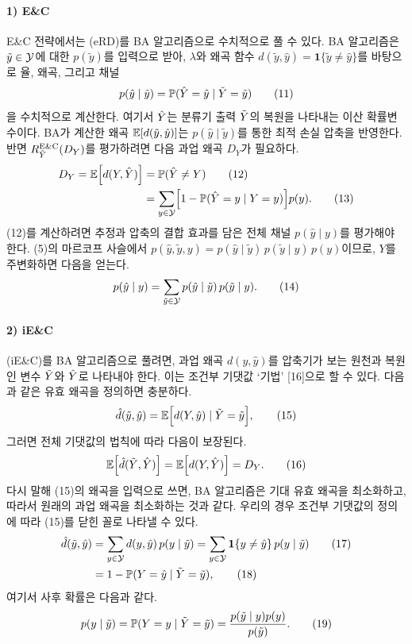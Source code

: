 \paragraph{1) E\&C}
E\&C 전략에서는 (eRD)를 BA 알고리즘으로 수치적으로 풀 수 있다. BA 알고리즘은 $\tilde y\in\mathcal{Y}$에 대한 $p(\tilde y)$를 입력으로 받아, $\lambda$와 왜곡 함수 $d(\tilde y,\hat y)=\mathbf 1\{\tilde y\ne\hat y\}$를 바탕으로 율, 왜곡, 그리고 채널
\begin{equation}
p(\hat y\mid\tilde y)=\mathbb{P}(\hat{Y}=\hat y\mid\tilde{Y}=\tilde y)\tag{11}
\end{equation}
을 수치적으로 계산한다. 여기서 $\hat{Y}$는 분류기 출력 $\tilde{Y}$의 복원을 나타내는 이산 확률변수이다. BA가 계산한 왜곡 $\mathbb{E}[d(\tilde y,\hat y)]$는 $p(\hat y\mid\tilde y)$를 통한 최적 손실 압축을 반영한다. 반면 $R_{\tilde{Y}}^{\mathrm{E\&C}}(D_Y)$를 평가하려면 다음 과업 왜곡 $D_Y$가 필요하다.
\begin{align}
D_Y=\mathbb{E}\Bigl[d(Y,\hat{Y})\Bigr]&=\mathbb{P}(\hat{Y}\ne Y)\tag{12}\\
&=\sum_{y\in\mathcal{Y}}\Bigl[1-\mathbb{P}(\hat{Y}=y\mid Y=y)\Bigr]p(y).\tag{13}
\end{align}
(12)를 계산하려면 추정과 압축의 결합 효과를 담은 전체 채널 $p(\hat y\mid y)$를 평가해야 한다. (5)의 마르코프 사슬에서 $p(\hat y,\tilde y,y)=p(\hat y\mid\tilde y)\,p(\tilde y\mid y)\,p(y)$이므로, $Y$를 주변화하면 다음을 얻는다.
\begin{equation}
p(\hat y\mid y)=\sum_{\tilde y\in\mathcal{Y}}p(\hat y\mid\tilde y)\,p(\tilde y\mid y).\tag{14}
\end{equation}

\paragraph{2) iE\&C}
(iE\&C)를 BA 알고리즘으로 풀려면, 과업 왜곡 $d(y,\hat y)$를 압축기가 보는 원천과 복원인 변수 $\tilde{Y}$와 $\hat{Y}$로 나타내야 한다. 이는 조건부 기댓값 `기법' [16]으로 할 수 있다. 다음과 같은 유효 왜곡을 정의하면 충분하다.
\begin{equation}
\hat d(\tilde y,\hat y)=\mathbb{E}\Bigl[d(Y,\hat y)\mid\tilde{Y}=\tilde y\Bigr],\tag{15}
\end{equation}
그러면 전체 기댓값의 법칙에 따라 다음이 보장된다.
\begin{equation}
\mathbb{E}\Bigl[\hat d(\tilde{Y},\hat{Y})\Bigr]=\mathbb{E}\Bigl[d(Y,\hat{Y})\Bigr]=D_Y.\tag{16}
\end{equation}
다시 말해 (15)의 왜곡을 입력으로 쓰면, BA 알고리즘은 기대 유효 왜곡을 최소화하고, 따라서 원래의 과업 왜곡을 최소화하는 것과 같다. 우리의 경우 조건부 기댓값의 정의에 따라 (15)를 닫힌 꼴로 나타낼 수 있다.
\begin{align}
\hat d(\tilde y,\hat y)&=\sum_{y\in\mathcal{Y}}d(y,\hat y)\,p(y\mid\tilde y)=\sum_{y\in\mathcal{Y}}\mathbf 1\{y\ne\hat y\}\,p(y\mid\tilde y)\tag{17}\\
&=1-\mathbb{P}(Y=\hat y\mid\tilde{Y}=\tilde y),\tag{18}
\end{align}
여기서 사후 확률은 다음과 같다.
\begin{equation}
p(y\mid\tilde y)=\mathbb{P}(Y=y\mid\tilde{Y}=\tilde y)=\frac{p(\tilde y\mid y)p(y)}{p(\tilde y)}.\tag{19}
\end{equation}

